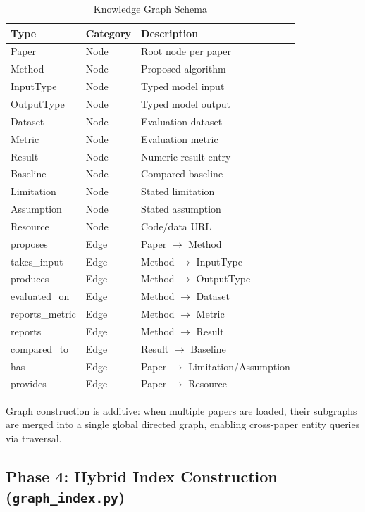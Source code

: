\documentclass[conference]{IEEEtran}
\begin{document}
\begin{table}[htbp]
  \caption{Knowledge Graph Schema}
  \label{tab:graph_schema}
  \centering
  \begin{tabular}{llp{3.6cm}}
    \toprule
    \textbf{Type} & \textbf{Category} & \textbf{Description} \\
    \midrule
    Paper       & Node & Root node per paper \\
    Method      & Node & Proposed algorithm \\
    InputType   & Node & Typed model input \\
    OutputType  & Node & Typed model output \\
    Dataset     & Node & Evaluation dataset \\
    Metric      & Node & Evaluation metric \\
    Result      & Node & Numeric result entry \\
    Baseline    & Node & Compared baseline \\
    Limitation  & Node & Stated limitation \\
    Assumption  & Node & Stated assumption \\
    Resource    & Node & Code/data URL \\
    \midrule
    proposes      & Edge & Paper $\to$ Method \\
    takes\_input  & Edge & Method $\to$ InputType \\
    produces      & Edge & Method $\to$ OutputType \\
    evaluated\_on & Edge & Method $\to$ Dataset \\
    reports\_metric & Edge & Method $\to$ Metric \\
    reports       & Edge & Method $\to$ Result \\
    compared\_to  & Edge & Result $\to$ Baseline \\
    has           & Edge & Paper $\to$ Limitation/Assumption \\
    provides      & Edge & Paper $\to$ Resource \\
    \bottomrule
  \end{tabular}
\end{table}

Graph construction is additive: when multiple papers are loaded, their
subgraphs are merged into a single global directed graph, enabling
cross-paper entity queries via traversal.

\subsection{Phase 4: Hybrid Index Construction (\texttt{graph\_index.py})}
\label{sec:index}
\end{document}
